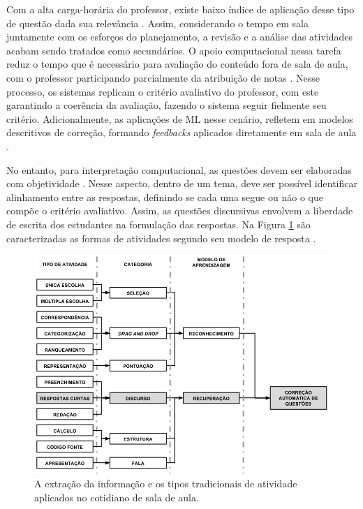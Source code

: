 Com a alta carga-horária do professor, existe baixo índice de aplicação desse tipo de questão dada sua relevância \cite{bilgin2017}. Assim, considerando o tempo em sala juntamente com os esforços do planejamento, a revisão e a análise das atividades acabam sendo tratados como secundários. O apoio computacional nessa tarefa reduz o tempo que é necessário para avaliação do conteúdo fora de sala de aula, com o professor participando parcialmente da atribuição de notas \cite{ming2005}. Nesse processo, os sistemas replicam o critério avaliativo do professor, com este garantindo a coerência da avaliação, fazendo o sistema seguir fielmente seu critério. Adicionalmente, as aplicações de ML nesse cenário, refletem em modelos descritivos de correção, formando \textit{feedbacks} aplicados diretamente em sala de aula \cite{butcher2010, bernius2022}. 

No entanto, para interpretação computacional, as questões devem ser elaboradas com objetividade \cite{bailey2008}. Nesse aspecto, dentro de um tema, deve ser possível identificar alinhamento entre as respostas, definindo se cada uma segue ou não o que compõe o critério avaliativo. Assim, as questões discursivas \cite{bezerra2008} envolvem a liberdade de escrita dos estudantes na formulação das respostas. Na Figura \ref{fig-atividades} são caracterizadas as formas de atividades segundo seu modelo de resposta \cite{spalenza2017}.

\begin{figure}[!h]
\centering
\includegraphics[width=\textwidth]{figuras/tiposAtividade}
\caption{A extração da informação e os tipos tradicionais de atividade aplicados no cotidiano de sala de aula.}
\label{fig-atividades}
\end{figure}

